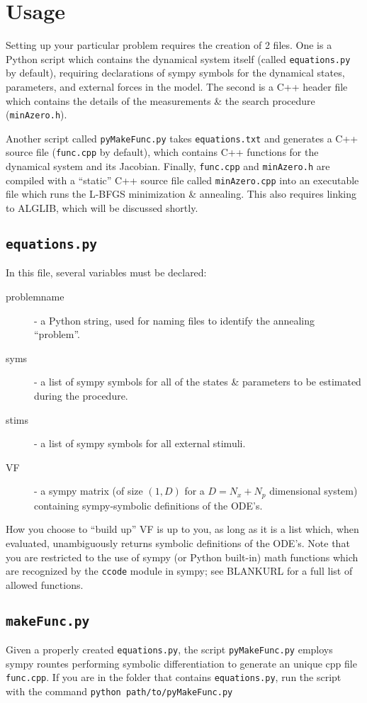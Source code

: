 \documentclass[11pt]{article}
\begin{document}
\section{Usage}
Setting up your particular problem requires the creation of 2 files.  One is a Python script which contains the dynamical system itself (called \texttt{equations.py} by default), requiring declarations of sympy symbols for the dynamical states, parameters, and external forces in the model.  The second is a C++ header file which contains the details of the measurements \& the search procedure (\texttt{minAzero.h}).

Another script called \texttt{pyMakeFunc.py} takes \texttt{equations.txt} and generates a C++ source file (\texttt{func.cpp} by default), which contains C++ functions for the dynamical system and its Jacobian.  Finally, \texttt{func.cpp} and \texttt{minAzero.h} are compiled with a ``static'' C++ source file called \texttt{minAzero.cpp} into an executable file which runs the L-BFGS minimization \& annealing.  This also requires linking to ALGLIB, which will be discussed shortly.

\subsection{\texttt{equations.py}}
In this file, several variables must be declared:
\begin{description}
\item[problem\textunderscore name] - a Python string, used for naming files to identify the annealing ``problem''.
\item[syms] - a list of sympy symbols for all of the states \& parameters to be estimated during the procedure.
\item[stims] - a list of sympy symbols for all external stimuli.
\item[VF] - a sympy matrix (of size $(1,D)$ for a $D = N_x + N_p$ dimensional system) containing sympy-symbolic definitions of the ODE's.
\end{description}
How you choose to ``build up'' VF is up to you, as long as it is a list which, when evaluated, unambiguously returns symbolic definitions of the ODE's.  Note that you are restricted to the use of sympy (or Python built-in) math functions which are recognized by the \texttt{ccode} module in sympy; see BLANKURL for a full list of allowed functions.

\subsection{\texttt{makeFunc.py}}
Given a properly created \texttt{equations.py}, the script \texttt{pyMakeFunc.py} employs sympy rountes performing symbolic differentiation to generate an unique cpp file \texttt{func.cpp}. If you are in the folder that contains \texttt{equations.py}, run the script with the command \texttt{python path/to/pyMakeFunc.py}
\end{document}
